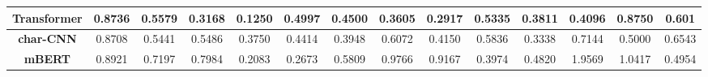 \documentclass[sigconf]{acmart}
\begin{document}
\begin{table*}[]
{\begin{tabular}{|c|c|c|c|c|c|c|c|c|c|c|c|c|c|}
\hline
\textbf{Transformer}            & 0.8736                                                                                     & 0.5579      & 0.3168           & 0.1250       & 0.4997                                                                       & 0.4500      & 0.3605           & 0.2917       & 0.5335                                                                                         & 0.3811      & 0.4096           & 0.8750       & 0.601                                                                                          \\ 
\hline
\textbf{char-CNN}               & 0.8708                                                                                     & 0.5441      & 0.5486           & 0.3750       & 0.4414                                                                       & 0.3948      & 0.6072           & 0.4150       & 0.5836                                                                                         & 0.3338      & 0.7144           & 0.5000       & 0.6543                                                                                          \\ 
\hline
\textbf{mBERT}                  & 0.8921                                                                                     & 0.7197      & 0.7984           & 0.2083       & 0.2673                                                                       & 0.5809      & 0.9766           & 0.9167       & 0.3974                                                                                         & 0.4820      & 1.9569           & 1.0417       & 0.4954                                                                                          \\
\hline
\end{tabular}
}
\end{table*}

\end{document}

